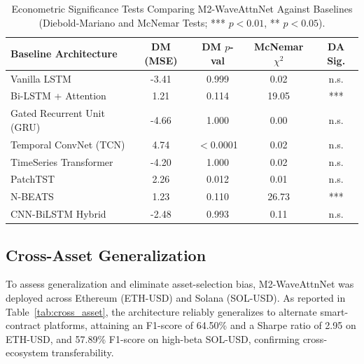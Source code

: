 \documentclass[journal]{IEEEtran}
\begin{document}
\begin{table}[ht]
\centering
\caption{Econometric Significance Tests Comparing M2-WaveAttnNet Against Baselines (Diebold-Mariano and McNemar Tests; *** $p<0.01$, ** $p<0.05$).}
\label{tab:stat_significance}
\begin{tabular}{lcccc}
\toprule
\textbf{Baseline Architecture} & \textbf{DM (MSE)} & \textbf{DM $p$-val} & \textbf{McNemar $\chi^2$} & \textbf{DA Sig.} \\
\midrule
Vanilla LSTM & -3.41 & 0.999 & 0.02 & n.s. \\
Bi-LSTM + Attention & 1.21 & 0.114 & 19.05 & *** \\
Gated Recurrent Unit (GRU) & -4.66 & 1.000 & 0.00 & n.s. \\
Temporal ConvNet (TCN) & 4.74 & $<$0.0001 & 0.02 & n.s. \\
TimeSeries Transformer & -4.20 & 1.000 & 0.02 & n.s. \\
PatchTST & 2.26 & 0.012 & 0.01 & n.s. \\
N-BEATS & 1.23 & 0.110 & 26.73 & *** \\
CNN-BiLSTM Hybrid & -2.48 & 0.993 & 0.11 & n.s. \\
\bottomrule
\end{tabular}
\end{table}

\subsection{Cross-Asset Generalization}
To assess generalization and eliminate asset-selection bias, M2-WaveAttnNet was deployed across Ethereum (ETH-USD) and Solana (SOL-USD). As reported in Table~\ref{tab:cross_asset}, the architecture reliably generalizes to alternate smart-contract platforms, attaining an F1-score of 64.50\% and a Sharpe ratio of 2.95 on ETH-USD, and 57.89\% F1-score on high-beta SOL-USD, confirming cross-ecosystem transferability.
\end{document}
